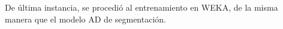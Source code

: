 \documentclass[twoside,spanish,ESP,MSc]{plantillaLabUPV}
\theoremstyle{definition}
\begin{document}
De última instancia, se procedió al entrenamiento en WEKA, de la misma manera que el modelo AD de segmentación.




%
%
%
%
%
%	
%	
\end{document}
